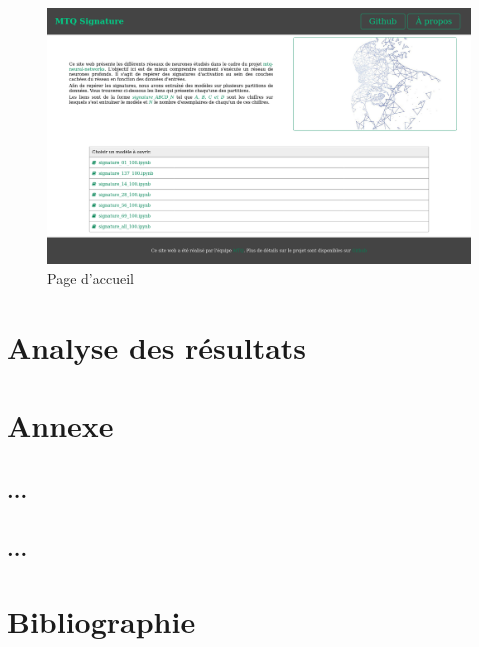 \documentclass[oneside,13pt,a4paper]{report}
\begin{document}
\begin{figure}[!h]
    \center
    \includegraphics[width=1.0\textwidth]{img/accueil.png}
    \caption{Page d'accueil}
\end{figure}


\chapter{Analyse des résultats}


\appendix
\chapter{Annexe}

\section{...}

\section{...}

\chapter{Bibliographie}
\end{document}
